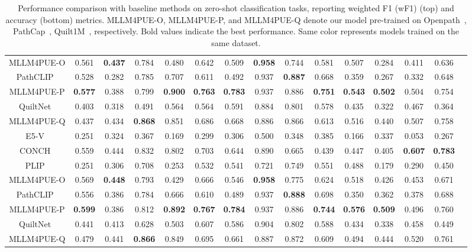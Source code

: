 \begin{table*}
{\begin{tabular}{ccccccccccccccc}
\rowcolor{trainA} MLLM4PUE-O & 0.561 & \textbf{0.437} & 0.784 & 0.480 & 0.642 & 0.509 & \textbf{0.958} & 0.744 & 0.581 & 0.507 & 0.284 & 0.411 & 0.636\\
\rowcolor{trainB} PathCLIP~\cite{sun2024pathasst} & 0.528 & 0.282 & 0.785 & 0.707 & 0.611 & 0.492 & 0.937 & \textbf{0.887} & 0.668 & 0.359 & 0.267 & 0.332 & 0.648 \\
\rowcolor{trainB} MLLM4PUE-P & \textbf{0.577} & 0.388 & 0.799 & \textbf{0.900} & \textbf{0.763} & \textbf{0.783} & 0.937 & 0.886 & \textbf{0.751} & \textbf{0.543} & \textbf{0.502} & 0.504 & 0.754 \\
\rowcolor{trainC} QuiltNet~\cite{ikezogwo2024quilt} & 0.403 & 0.318 & 0.491 & 0.564 & 0.564 & 0.591 & 0.884 & 0.801 & 0.578 & 0.435 & 0.322 & 0.467 & 0.364 \\
\rowcolor{trainC} MLLM4PUE-Q & 0.437 & 0.434 & \textbf{0.868} & 0.851 & 0.686 & 0.668 & 0.886 & 0.866 & 0.613 & 0.516 & 0.440 & 0.507 & 0.758\\
\hline
\hline
E5-V~\cite{jiang2024e5} & 0.251 & 0.324 & 0.367 & 0.169 & 0.299 & 0.306 & 0.500 & 0.348 & 0.385 & 0.166 & 0.337 & 0.053 & 0.267 \\
CONCH~\cite{lu2024visual} & 0.559 & 0.444 & 0.832 & 0.802 & 0.703 & 0.644 & 0.890 & 0.665 & 0.439 & 0.447 & 0.405 & \textbf{0.607} & \textbf{0.783} \\
\rowcolor{trainA} PLIP~\cite{huang2023visual} & 0.251 & 0.306 & 0.708 & 0.253 & 0.532 & 0.541 & 0.721 & 0.749 & 0.551 & 0.488 & 0.179 & 0.290 & 0.450 \\
\rowcolor{trainA} MLLM4PUE-O & 0.569 & \textbf{0.448} & 0.793 & 0.429 & 0.666 & 0.546 & \textbf{0.958} & 0.775 & 0.624 & 0.518 & 0.426 & 0.453 & 0.671 \\
\rowcolor{trainB} PathCLIP~\cite{sun2024pathasst} & 0.556 & 0.386 & 0.784 & 0.666 & 0.610 & 0.489 & 0.937 & \textbf{0.888} & 0.698 & 0.350 & 0.362 & 0.378 & 0.688 \\
\rowcolor{trainB} MLLM4PUE-P & \textbf{0.599} & 0.386 & 0.812 & \textbf{0.892} & \textbf{0.767} & \textbf{0.784} & 0.937 & 0.886 & \textbf{0.744} & \textbf{0.576} & \textbf{0.509} & 0.496 & 0.760 \\
\rowcolor{trainC} QuiltNet~\cite{ikezogwo2024quilt} & 0.441 & 0.413 & 0.628 & 0.503 & 0.607 & 0.586 & 0.904 & 0.802 & 0.588 & 0.434 & 0.338 & 0.458 & 0.449 \\
\rowcolor{trainC} MLLM4PUE-Q & 0.479 & 0.441 & \textbf{0.866} & 0.849 & 0.695 & 0.661 & 0.887 & 0.872 & 0.609 & 0.494 & 0.444 & 0.520 & 0.761\\
\hline
\end{tabular}
}
\caption{Performance comparison with baseline methods on zero-shot classification tasks, reporting weighted F1 (wF1) (top) and accuracy (bottom) metrics. MLLM4PUE-O, MLLM4PUE-P, and MLLM4PUE-Q denote our model pre-trained on Openpath~\cite{huang2023visual}, PathCap~\cite{sun2024pathasst},  Quilt1M~\cite{ikezogwo2024quilt}, respectively. Bold values indicate the best performance. Same color represents models trained on the same dataset.}
\label{t3}
  \vspace{-2ex}
\end{table*}
